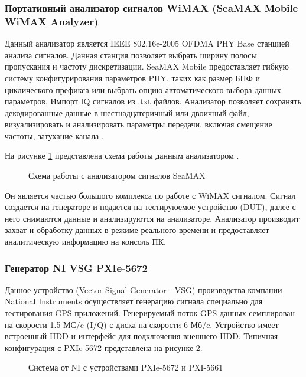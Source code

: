 \subsubsection*{Портативный анализатор сигналов WiMAX (SeaMAX Mobile WiMAX Analyzer)}
Данный анализатор является IEEE 802.16e-2005 OFDMA PHY Base станцией анализа сигналов. Данная станция 
позволяет выбрать ширину полосы пропускания и частоту дискретизации.
SeaMAX Mobile предоставляет гибкую систему конфигурирования параметров PHY, таких как
размер БПФ и циклического префикса или выбрать опцию автоматического выбора данных параметров. Импорт IQ сигналов
из .txt файлов. Анализатор позволяет сохранять декодированные данные в шестнадцатеричный или двоичный файл,
визуализировать и анализировать параметры передачи, включая смещение частоты, затухание канала
\cite{seamax_overview, seamax_pdf}.

На рисунке \ref{pic:seamax} представлена схема работы данным анализатором \cite{seamax_pdf}.

\begin{figure}[H]
\caption{Схема работы с анализатором сигналов SeaMAX}
\label{pic:seamax}
\end{figure}
Он является частью большого комплекса по работе
с WiMAX сигналом. Сигнал создается на генераторе и подается на тестируюемое устройство (DUT), далее с него снимаются 
данные и анализируются на анализаторе. Анализатор производит захват и обработку данных в режиме реального времени и
предоставляет аналитическую информацию на консоль ПК.

\subsubsection*{Генератор NI VSG PXIe-5672}
\label{sec:vsg}
Данное устройство (Vector Signal Generator - VSG) производства компании National Instruments осуществляет генерацию сигнала специально для тестирования
GPS приложений. Генерируемый поток GPS-данных семплирован на скорости 1.5 МС/c (I/Q) с диска на скорости 6 Мб/c.
Устройство имеет встроенный HDD и интерфейс для подключения внешнего HDD. Типичная конфигурация с PXIe-5672
представлена на рисунке \ref{pic:ni_system}.

\begin{figure}[H]
\begin{center}
\end{center}
\caption{Система от NI с устройствами PXIe-5672 и PXI-5661}
\label{pic:ni_system}
\end{figure}

